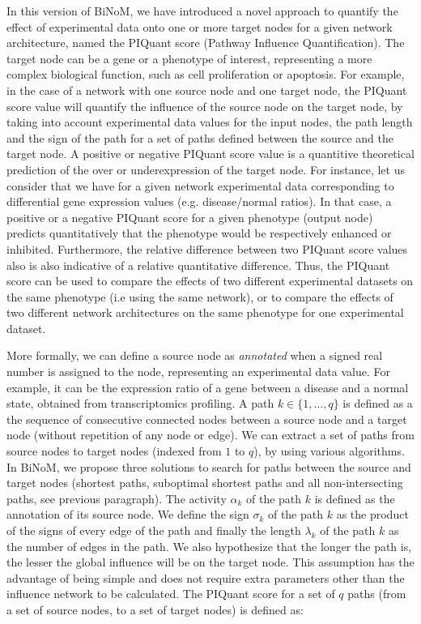 \documentclass[10pt]{bmc_article}
\newenvironment{bmcformat}{\baselineskip20pt\sloppy\setboolean{publ}{false}}{\baselineskip20pt\sloppy}
\begin{document}
\begin{bmcformat}
In this version of BiNoM, we have introduced a novel approach to quantify the
effect of experimental data onto one or more target nodes for a given
network architecture, named the PIQuant score (Pathway Influence Quantification).
The target node can be a gene or a phenotype of interest, representing a more complex
biological function, such as cell proliferation or apoptosis.
For example, in the case of a network
with one source node and one target node,
the PIQuant score value will quantify the influence of the source node on the target
node, by taking into account experimental data values for the input nodes,
the path length and the sign of the path for a set of paths defined between the
source and the target node.
A positive or negative PIQuant score value is a quantitive theoretical
prediction of the over or underexpression of
the target node. For instance, let us consider that we have for a given network
experimental data corresponding to differential gene expression values (e.g.
disease/normal ratios).
In that case, a positive or a negative PIQuant score for a given phenotype
(output node) predicts quantitatively
that the phenotype would be respectively enhanced or inhibited. Furthermore, the
relative difference between two PIQuant score values also is also indicative of
a relative quantitative difference. Thus, the PIQuant score can be used to
compare the effects of two different experimental datasets on the same phenotype
(i.e using the same network), or to compare the effects of two different network
architectures on the same phenotype for one experimental dataset.


More formally, we can define a source node as \textit{annotated} when a signed real
number is assigned to the node, representing an experimental data value. For example, it
can be the expression ratio of a gene between a disease and a normal state,
obtained from transcriptomics profiling.
 A path $k \in \{1,\ldots , q\}$ is defined
as a the sequence of consecutive connected nodes
between a source node and a target node (without repetition of any node
or edge). We can extract a set of paths from source nodes to target nodes (indexed
from $1$ to $q$), by using various algorithms. In BiNoM, we propose three solutions to search for paths between the
source and target nodes (shortest paths, suboptimal shortest paths and all
non-intersecting paths, see previous paragraph). The activity
$\alpha_k$ of the path $k$ is defined as the annotation
of its source node. We define the sign $\sigma_k$
of the path $k$ as the product of the signs of every edge of the path and finally
the length $\lambda_k$ of the path $k$ as the number of edges in the path. We also
hypothesize that the longer the path is, the lesser the global influence will be
on the target node. This assumption has the advantage of being simple and does
not require extra parameters other than the influence network to be calculated.
The PIQuant score for a set of $q$ paths (from a set of source nodes, to a set
of target nodes) is defined as:


\end{bmcformat}
\end{document}
